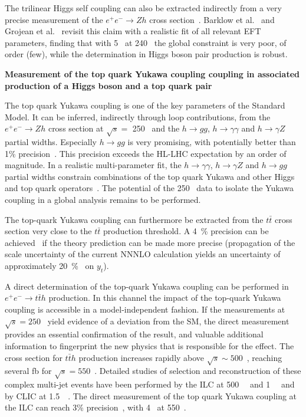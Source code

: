 
The trilinear Higgs self coupling can also be extracted indirectly from a very precise
measurement of the $e^+ e^- \rightarrow Zh$ cross section~\cite{McCullough:2013rea}. Barklow et al.~\cite{Barklow:2017awn}
and Grojean et al.~\cite{DiVita:2017vrr} revisit this claim with a realistic fit of
all relevant EFT parameters, finding that with 5~\invab
 at 240~\GeV
the global constraint is very poor, of order (few), while the determination in Higgs boson pair production is robust. 

{\bf Measurement of the top quark Yukawa coupling coupling in associated production of a Higgs boson and a top quark pair}

The top quark Yukawa coupling is one of the key parameters of the Standard Model. 
It can be inferred, indirectly through loop contributions, from the $e^+e^- \rightarrow Zh$
cross section at $\sqrt{s}= $ 250~\GeV{} and the $h \rightarrow gg$, $h \rightarrow \gamma \gamma$
and $h \rightarrow \gamma Z$ partial widths. Especially $h \rightarrow gg$ is very promising, with potentially
better than 1\% precision~\cite{Boselli:2018zxr}. This precision exceeds the HL-LHC expectation by an order of magnitude.
In a realistic multi-parameter fit, the $h \rightarrow \gamma \gamma$, $h \rightarrow \gamma Z$ and $h \rightarrow gg$
partial widths constrain combinations of the top quark Yukawa and other Higgs~\cite{Azatov:2016xik} and top quark
operators~\cite{Vryonidou:2018eyv}. The potential of the 250~\GeV{} data to isolate the Yukawa
coupling in a global analysis remains to be performed.

The top-quark Yukawa coupling can furthermore be extracted from the $t\bar{t}$
cross section very close to the $t\bar{t}$ production threshold. A 4~\% precision can be achieved~\cite{Horiguchi:2013wra}
if the theory prediction can be made more precise (propagation of the scale uncertainty of the current NNNLO calculation yields
an uncertainty of approximately 20~\%~\cite{Vos:2016til} on $y_t$).

A direct determination of the top-quark Yukawa coupling can be performed in $e^+e^- \rightarrow t\bar{t}h$ production.
In this channel the impact of the top-quark Yukawa coupling is accessible in a model-independent fashion. If the
measurements at $\sqrt{s}=250$~\GeV{} yield evidence of a deviation from the SM, the direct measurement provides
an essential confirmation of the result, and valuable additional information to fingerprint the new physics that
is responsible for the effect. The cross section for $t\bar{t}h$ production increases rapidly above $\sqrt{s} \sim 500 $~\GeV{},
reaching several fb for $\sqrt{s} = 550$~\GeV. Detailed studies of selection and reconstruction of these complex multi-jet events
have been performed by the ILC at 500~\GeV~\cite{Yonamine:2011jg} and 1~\TeV~\cite{Price:2014oca} and by CLIC
at 1.5~\TeV~\cite{Abramowicz:2018rjq}. The direct measurement of the top quark Yukawa coupling at the ILC can reach 3\%
precision~\cite{Fujii:2015jha}, with 4~\invab 
at 550~\GeV.




